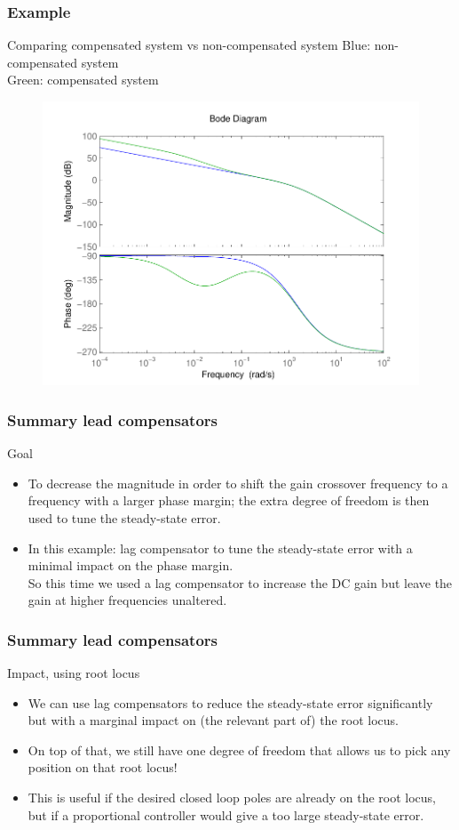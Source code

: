 \begin{frame}
\frametitle{Example}
\begin{block}{Comparing compensated system vs non-compensated system}
Blue: non-compensated system \\
Green: compensated system
\begin{figure}
	\centering
	\includegraphics[width=0.5
	\linewidth]{bodeexamplelagcomparing}
\end{figure}
\end{block}
\end{frame}

\begin{frame}
\frametitle{Summary lead compensators}
\begin{block}{Goal}
	\begin{itemize}
\item To decrease the magnitude in order to shift the gain crossover frequency to a frequency with a larger phase margin; the extra degree of freedom is then used to tune the steady-state error.
\item In this example: lag compensator to tune the steady-state error with a minimal impact on the phase margin. \\
So this time we used a lag compensator to increase the DC gain but leave the gain at higher frequencies unaltered.
\end{itemize}
\end{block}
\end{frame}

\begin{frame}
\frametitle{Summary lead compensators}
\begin{block}{Impact, using root locus}
\begin{itemize}
\item We can use lag compensators to reduce the steady-state error significantly but with a marginal impact on (the relevant part of) the root locus.
\item On top of that, we still have one degree of freedom that allows us to pick any position on that root locus!
\item This is useful if the desired closed loop poles are already on the root locus, but if a proportional controller would give a too large steady-state error.
\end{itemize}
\end{block}
\end{frame}


